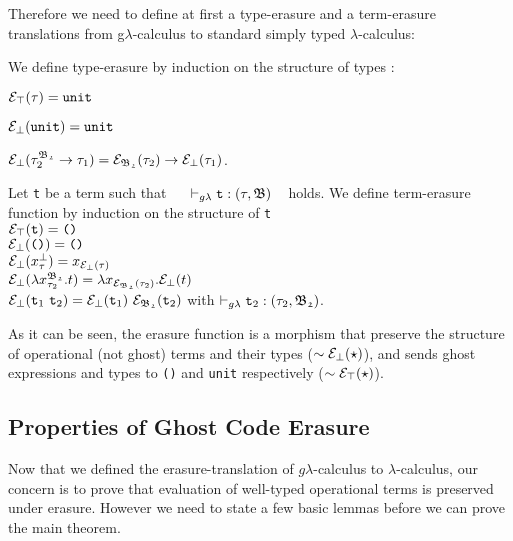 Therefore we need to define at first a type-erasure and a term-erasure translations from g$\lambda$-calculus to standard simply typed  
$\lambda$-calculus:  

\begin{dfn} 
\label{type-erasure}
We define type-erasure by induction on the structure of types : \vspace{0.2cm} 

\noindent$ \mathcal{E}_{\top}(\tau) = \texttt{unit} $ 

\noindent$ \mathcal{E}_{\bot}(\texttt{unit}) = \texttt{unit}$ 

\noindent$ \mathcal{E}_{\bot}(\tau_{2}^{\mathfrak{B_{2}}} \rightarrow \tau_{1})  
= \mathcal{E}_{\mathfrak{B_{2}}}(\tau_{2}) \rightarrow \mathcal{E}_{\bot}(\tau_{1}) $. \\
\end{dfn} 

\begin{dfn} 
\label{term-erasure}
Let \texttt{t} be a term such that 
~~ $\vdash_{g\lambda} \texttt{t} : (\tau, \mathfrak{B})$ ~ holds. 
We define term-erasure function by induction on 
the structure of \texttt{t}\\[0.1cm]
$ \mathcal{E}_{\top}(\texttt{t}) = \texttt{()}$\\[0.05cm]
$\mathcal{E}_{\bot}(\texttt{()}) = \texttt{()}$\\[0.05cm]
$\mathcal{E}_{\bot}(x_{\tau}^{\bot}) = x_{\mathcal{E}_{\bot}(\tau)}$\\[0.05cm]  
$\mathcal{E}_{\bot}(\lambda x_{\tau_{2}}^{\mathfrak{B_{2}}}.t) 
= \lambda x_{\mathcal{E}_{\mathfrak{B_{2}}}(\tau_{2})}. \mathcal{E}_{\bot}(t)$\\[0.05cm]  
$\mathcal{E}_{\bot}(\texttt{t}_{1} ~ \texttt{t}_{2}) 
= \mathcal{E}_{\bot}(\texttt{t}_{1})  ~ \mathcal{E}_{\mathfrak{B_{2}}}(\texttt{t}_{2})$
\quad with $ \vdash_{g\lambda} \texttt{t}_{2} : (\tau_{2}, \mathfrak{B_{2}})$.
\end{dfn}
As it can be seen, the erasure function is a morphism that preserve
the structure of operational (not ghost) terms and their types ($\sim\mathcal{E}_{\bot}(\star)$), and sends ghost expressions and types to \texttt{()} and \texttt{unit} respectively ($\sim\mathcal{E}_{\top}(\star)$).




\subsection{Properties of Ghost Code Erasure}

Now that we defined the erasure-translation of $g\lambda$-calculus to $\lambda$-calculus, our concern is to prove that evaluation of well-typed operational terms is preserved under erasure. However we need to state a 
few basic lemmas before we can prove the main theorem. 


